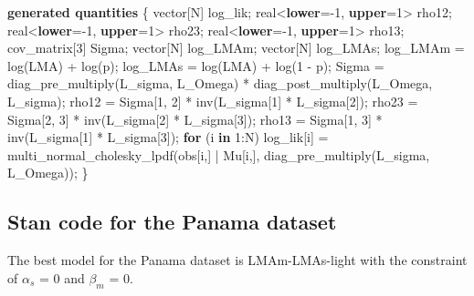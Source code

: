 \documentclass[
  12pt,
  letterpaper,
  DIV=11,
  numbers=noendperiod]{scrartcl}
\newenvironment{Shaded}{\begin{snugshade}}{\end{snugshade}}
\newcommand{\ControlFlowTok}[1]{\textcolor[rgb]{0.00,0.23,0.31}{\textbf{#1}}}
\newcommand{\DataTypeTok}[1]{\textcolor[rgb]{0.68,0.00,0.00}{#1}}
\newcommand{\DecValTok}[1]{\textcolor[rgb]{0.68,0.00,0.00}{#1}}
\newcommand{\KeywordTok}[1]{\textcolor[rgb]{0.00,0.23,0.31}{\textbf{#1}}}
\newcommand{\NormalTok}[1]{\textcolor[rgb]{0.00,0.23,0.31}{#1}}
\numberwithin{equation}{section} %
\begin{document}
\begin{Shaded}
\begin{Highlighting}[]
\KeywordTok{generated quantities}\NormalTok{ \{}
  \DataTypeTok{vector}\NormalTok{[N] log\_lik;}
  \DataTypeTok{real}\NormalTok{\textless{}}\KeywordTok{lower}\NormalTok{={-}}\DecValTok{1}\NormalTok{, }\KeywordTok{upper}\NormalTok{=}\DecValTok{1}\NormalTok{\textgreater{} rho12;}
  \DataTypeTok{real}\NormalTok{\textless{}}\KeywordTok{lower}\NormalTok{={-}}\DecValTok{1}\NormalTok{, }\KeywordTok{upper}\NormalTok{=}\DecValTok{1}\NormalTok{\textgreater{} rho23;}
  \DataTypeTok{real}\NormalTok{\textless{}}\KeywordTok{lower}\NormalTok{={-}}\DecValTok{1}\NormalTok{, }\KeywordTok{upper}\NormalTok{=}\DecValTok{1}\NormalTok{\textgreater{} rho13;}
  \DataTypeTok{cov\_matrix}\NormalTok{[}\DecValTok{3}\NormalTok{] Sigma;}
  \DataTypeTok{vector}\NormalTok{[N] log\_LMAm;}
  \DataTypeTok{vector}\NormalTok{[N] log\_LMAs;}
\NormalTok{  log\_LMAm = log(LMA) + log(p);}
\NormalTok{  log\_LMAs = log(LMA) + log(}\DecValTok{1}\NormalTok{ {-} p);}
\NormalTok{  Sigma = diag\_pre\_multiply(L\_sigma, L\_Omega)}
\NormalTok{     * diag\_post\_multiply(L\_Omega\textquotesingle{}, L\_sigma);}
\NormalTok{  rho12 = Sigma[}\DecValTok{1}\NormalTok{, }\DecValTok{2}\NormalTok{] * inv(L\_sigma[}\DecValTok{1}\NormalTok{] * L\_sigma[}\DecValTok{2}\NormalTok{]);}
\NormalTok{  rho23 = Sigma[}\DecValTok{2}\NormalTok{, }\DecValTok{3}\NormalTok{] * inv(L\_sigma[}\DecValTok{2}\NormalTok{] * L\_sigma[}\DecValTok{3}\NormalTok{]);}
\NormalTok{  rho13 = Sigma[}\DecValTok{1}\NormalTok{, }\DecValTok{3}\NormalTok{] * inv(L\_sigma[}\DecValTok{1}\NormalTok{] * L\_sigma[}\DecValTok{3}\NormalTok{]);}
  \ControlFlowTok{for}\NormalTok{ (i }\ControlFlowTok{in} \DecValTok{1}\NormalTok{:N)}
\NormalTok{   log\_lik[i] = multi\_normal\_cholesky\_lpdf(obs[i,] | Mu[i,], diag\_pre\_multiply(L\_sigma, L\_Omega));}
\NormalTok{ \}}
\end{Highlighting}
\end{Shaded}

\subsection{Stan code for the Panama
dataset}\label{stan-code-for-the-panama-dataset}

The best model for the Panama dataset is LMAm-LMAs-light with the
constraint of \(\alpha_s\) = 0 and \(\beta_m\) = 0.
\end{document}
